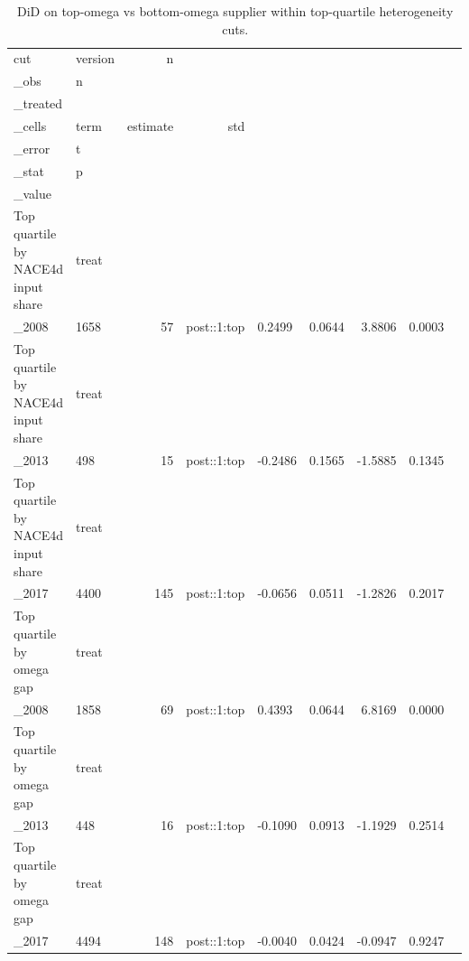 \begin{table}[ht]
\centering
\caption{DiD on top-omega vs bottom-omega supplier within top-quartile heterogeneity cuts.} 
\begin{tabular}{llrrlrrrr}
  \toprule
cut & version & n\\_obs & n\\_treated\\_cells & term & estimate & std\\_error & t\\_stat & p\\_value \\ 
  \midrule
Top quartile by NACE4d input share & treat\\_2008 &  1658 &    57 & post::1:top & 0.2499 & 0.0644 & 3.8806 & 0.0003 \\ 
  Top quartile by NACE4d input share & treat\\_2013 &   498 &    15 & post::1:top & -0.2486 & 0.1565 & -1.5885 & 0.1345 \\ 
  Top quartile by NACE4d input share & treat\\_2017 &  4400 &   145 & post::1:top & -0.0656 & 0.0511 & -1.2826 & 0.2017 \\ 
  Top quartile by omega gap & treat\\_2008 &  1858 &    69 & post::1:top & 0.4393 & 0.0644 & 6.8169 & 0.0000 \\ 
  Top quartile by omega gap & treat\\_2013 &   448 &    16 & post::1:top & -0.1090 & 0.0913 & -1.1929 & 0.2514 \\ 
  Top quartile by omega gap & treat\\_2017 &  4494 &   148 & post::1:top & -0.0040 & 0.0424 & -0.0947 & 0.9247 \\ 
   \bottomrule
\end{tabular}
\end{table}
